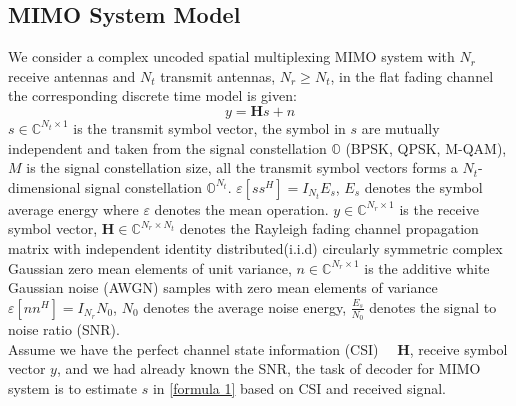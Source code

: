 \documentclass[12pt,a4paper,final]{article}
\begin{document}
\begin{spacing}{2.5}
\section{MIMO System Model}\label{system}
We consider a complex uncoded spatial multiplexing MIMO system with $N_r$ receive antennas and $N_t$ transmit antennas, $N_{r}\geq N_{t}$, in the flat fading channel the corresponding discrete time model is given:
\begin{equation}
y=\mathbf{H}s+n   \label{formula 1}
\end{equation}
$s\in \mathbb{C}^{N_{t}\times 1}$ is the transmit symbol vector, the symbol in $s$ are mutually independent and taken from the signal constellation $\mathbb{O}$ (BPSK, QPSK, M-QAM), $M$ is the signal constellation size, all the transmit symbol vectors forms a $N_{t}$-dimensional signal constellation $\mathbb{O}^{N_{t}}$. $\varepsilon[ss^{H}]=I_{N_t}E_{s}$, $E_{s}$ denotes the symbol average energy where $\varepsilon$ denotes the mean operation.  $y\in \mathbb{C}^{N_{r}\times 1}$ is the receive symbol vector, $\mathbf{H}\in \mathbb{C}^{N_{r}\times N_{t}}$ denotes the Rayleigh fading channel propagation matrix with independent identity distributed(i.i.d) circularly symmetric complex Gaussian zero mean elements of unit variance, $n\in \mathbb{C}^{N_{r}\times 1}$ is the additive white Gaussian noise (AWGN) samples with zero mean elements of variance $\varepsilon[nn^{H}]=I_{N_{r}}N_{0}$, $N_{0}$ denotes the average noise energy, $\frac{E_{s}}{N_{0}}$ denotes the signal to noise ratio (SNR). \\
  Assume we have the perfect channel state information (CSI)  $\quad \mathbf{H}$, receive symbol vector $y$, and we had already known the SNR, the task of decoder for MIMO system is to estimate $s$ in \ref{formula 1} based on CSI and received signal.



\end{spacing}
\end{document}
